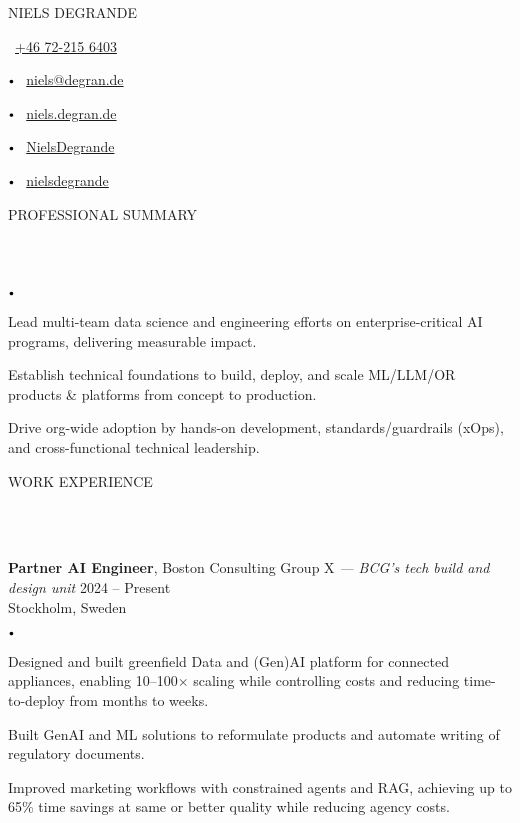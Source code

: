 \documentclass{article}
\newcommand{\contact}[2]{
    \begin{center}
    {\LARGE \uppercase {#1}} \\
    \vspace{8pt}
    #2
    \end{center}
}
\newcommand{\header}[1]{
    {
        \hspace*{-4pt}
        \vspace*{8pt}
        \uppercase{#1}
    }
    \vspace*{-4pt} 
    \lineunder
    \vspace*{8pt}
}
\newcommand{\lineunder}{
    \vspace*{-8pt} \\ 
    \hspace*{-4pt} 
    \hrulefill \\
}
\newcommand{\experience}[5]{
    \vspace*{2pt}
    \textbf{#1}, #2 \hfill #3 \\ 
    #4 \\
    #5
    \vspace*{2pt}
}
\newcommand{\bigdot}{
    $\vcenter{\hbox{\tiny$\bullet$}}$\hspace*{2pt}
}
\newcommand{\spacedbullet}{
    $\vcenter{\hbox{\tiny$\bullet$}}$\hspace*{-2pt}
}
\newenvironment{bulletlist}{
    \begin{list}
        {\spacedbullet}{\setlength\leftmargin{10pt} 
        \topsep 0pt \itemsep -2pt}}{\vspace*{4pt}
    \end{list}
}
\begin{document}
\small

\vspace*{-32pt}

\contact{Niels Degrande}
{
    \faPhone\ \href{tel:+46722156403}{+46 72-215 6403}
    \bigdot \faEnvelope\ \href{mailto:niels@degran.de}{niels@degran.de}
    \bigdot \faGlobe\ \href{https://niels.degran.de}{niels.degran.de}
    \bigdot \faGithub\ \href{https://github.com/NielsDegrande}{NielsDegrande}
    \bigdot \faLinkedin\ \href{https://linkedin.com/in/nielsdegrande}{nielsdegrande}
}

\vspace{16pt}

\header{Professional Summary}
\begin{bulletlist}
    \item Lead multi-team data science and engineering efforts on enterprise-critical AI programs, delivering measurable impact.
    \item Establish technical foundations to build, deploy, and scale ML/LLM/OR products \& platforms from concept to production.
    \item Drive org-wide adoption by hands-on development, standards/guardrails (xOps), and cross-functional technical leadership.
\end{bulletlist}

\vspace*{4pt}

\header{Work Experience}
\experience{Partner AI Engineer}{Boston Consulting Group X \textit{— BCG's tech build and design unit}}{2024 -- Present}{Stockholm, Sweden}
{
    \begin{bulletlist}
        \item Designed and built greenfield Data and (Gen)AI platform for connected appliances, enabling 10--100$\times$ scaling while controlling costs and reducing time-to-deploy from months to weeks.
        \item Built GenAI and ML solutions to reformulate products and automate writing of regulatory documents.
        \item Improved marketing workflows with constrained agents and RAG, achieving up to 65\% time savings at same or better quality while reducing agency costs.
    \end{bulletlist}
}
\end{document}
